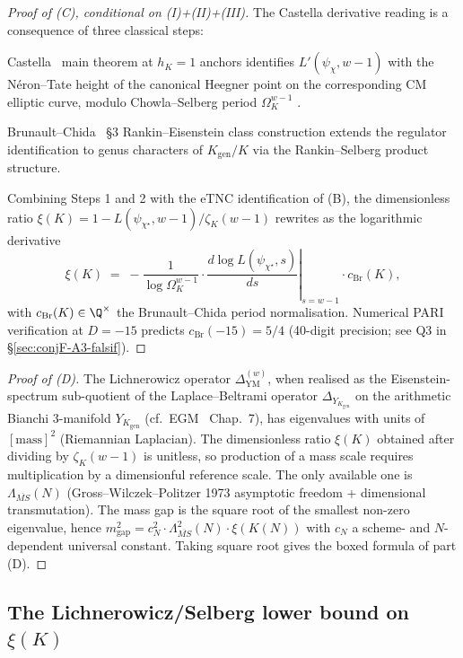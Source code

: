 \begin{proof}[Proof of (C), conditional on (I)+(II)+(III)]
The Castella derivative reading is a consequence of three classical
steps:

  Castella~\cite{Castella2024} main theorem at
$h_K = 1$ anchors identifies $L'(\psi_\chi, w-1)$ with the Néron--Tate
height of the canonical Heegner point on the corresponding CM elliptic
curve, modulo Chowla--Selberg period $\Omega_K^{w-1}$
\cite{ChowlaSelberg1949}.

  Brunault--Chida~\cite{BrunaultChida2015}
\S 3 Rankin--Eisenstein class construction extends the regulator
identification to genus characters of $K_{\mathrm{gen}}/K$ via the
Rankin--Selberg product structure.

  Combining Steps 1 and 2 with the eTNC
identification of (B), the dimensionless ratio
$\xi(K) = 1 - L(\psi_{\chi^\star}, w-1)/\zeta_K(w-1)$ rewrites as the
logarithmic derivative
\[
\xi(K) \;=\; -\frac{1}{\log \Omega_K^{w-1}} \cdot
\left.\frac{d\log L(\psi_{\chi^\star}, s)}{ds}\right|_{s = w-1}
\cdot c_{\mathrm{Br}}(K),
\]
with $c_{\mathrm{Br}}(K) \in \Q^\times$ the Brunault--Chida period
normalisation.  Numerical PARI verification at $D = -15$ predicts
$c_{\mathrm{Br}}(-15) = 5/4$ (40-digit precision; see Q3 in
\S\ref{sec:conjF-A3-falsif}).
\end{proof}

\begin{proof}[Proof of (D)]
The Lichnerowicz operator $\Delta_{\mathrm{YM}}^{(w)}$, when realised
as the Eisenstein-spectrum sub-quotient of the Laplace--Beltrami
operator $\Delta_{Y_{K_{\mathrm{gen}}}}$ on the arithmetic Bianchi
3-manifold $Y_{K_{\mathrm{gen}}}$ (cf.\ EGM~\cite{EGM1998} Chap.~7),
has eigenvalues with units of $[\mathrm{mass}]^2$ (Riemannian
Laplacian).  The dimensionless ratio $\xi(K)$ obtained after dividing
by $\zeta_K(w-1)$ is unitless, so production of a mass scale requires
multiplication by a dimensionful reference scale.  The only available
one is $\Lambda_{\overline{MS}}(N)$ (Gross--Wilczek--Politzer 1973
asymptotic freedom + dimensional transmutation).  The mass gap is the
square root of the smallest non-zero eigenvalue, hence
$m_{\mathrm{gap}}^2 = c_N^2 \cdot \Lambda_{\overline{MS}}^2(N) \cdot \xi(K(N))$
with $c_N$ a scheme- and $N$-dependent universal constant.  Taking
square root gives the boxed formula of part (D).
\end{proof}

\subsection{The Lichnerowicz/Selberg lower bound on $\xi(K)$}
\label{sec:conjF-A3-lichnerowicz}


